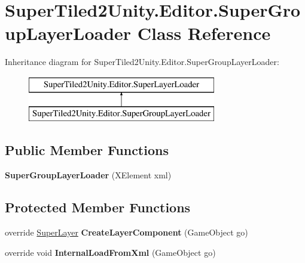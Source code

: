 \hypertarget{class_super_tiled2_unity_1_1_editor_1_1_super_group_layer_loader}{}\section{Super\+Tiled2\+Unity.\+Editor.\+Super\+Group\+Layer\+Loader Class Reference}
\label{class_super_tiled2_unity_1_1_editor_1_1_super_group_layer_loader}
Inheritance diagram for Super\+Tiled2\+Unity.\+Editor.\+Super\+Group\+Layer\+Loader\+:\begin{figure}[H]
\begin{center}
\leavevmode
\includegraphics[height=2.000000cm]{class_super_tiled2_unity_1_1_editor_1_1_super_group_layer_loader}
\end{center}
\end{figure}
\subsection*{Public Member Functions}
\begin{DoxyCompactItemize}
\item 
\mbox{\label{class_super_tiled2_unity_1_1_editor_1_1_super_group_layer_loader_a82f1e5808f0a0d1ec60f2ab7d238925a}} 
{\bfseries Super\+Group\+Layer\+Loader} (X\+Element xml)
\end{DoxyCompactItemize}
\subsection*{Protected Member Functions}
\begin{DoxyCompactItemize}
\item 
\mbox{\label{class_super_tiled2_unity_1_1_editor_1_1_super_group_layer_loader_a613bc67815ff7340c6d7708d20a3be23}} 
override \mbox{\hyperlink{class_super_tiled2_unity_1_1_super_layer}{Super\+Layer}} {\bfseries Create\+Layer\+Component} (Game\+Object go)
\item 
\mbox{\label{class_super_tiled2_unity_1_1_editor_1_1_super_group_layer_loader_aff23245efbbf6b99a538fedc7666d502}} 
override void {\bfseries Internal\+Load\+From\+Xml} (Game\+Object go)
\end{DoxyCompactItemize}
